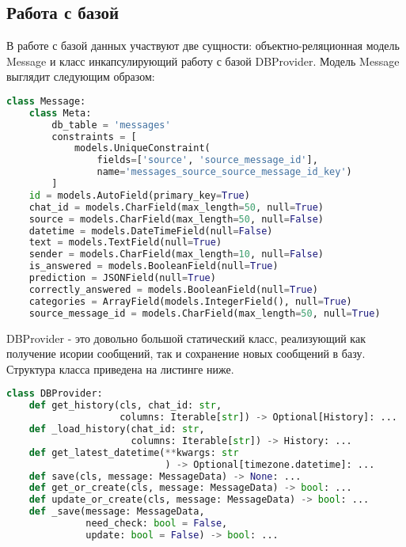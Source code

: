     \subsection{Работа с базой}
    В работе с базой данных участвуют две сущности: объектно-реляционная модель Message
    и класс инкапсулирующий работу с базой DBProvider.
    Модель Message выглядит следующим образом:
\begin{lstlisting}[language=Python]
class Message:
    class Meta:
        db_table = 'messages'
        constraints = [
            models.UniqueConstraint(
                fields=['source', 'source_message_id'],
                name='messages_source_source_message_id_key')
        ]
    id = models.AutoField(primary_key=True)
    chat_id = models.CharField(max_length=50, null=True)
    source = models.CharField(max_length=50, null=False)
    datetime = models.DateTimeField(null=False)
    text = models.TextField(null=True)
    sender = models.CharField(max_length=10, null=False)
    is_answered = models.BooleanField(null=True)
    prediction = JSONField(null=True)
    correctly_answered = models.BooleanField(null=True)
    categories = ArrayField(models.IntegerField(), null=True)
    source_message_id = models.CharField(max_length=50, null=True)
\end{lstlisting}

    DBProvider - это довольно большой статический класс, реализующий как получение исории сообщений,
    так и сохранение новых сообщений в базу.
    Структура класса приведена на листинге ниже.
\begin{lstlisting}[language=Python]
class DBProvider:
    def get_history(cls, chat_id: str, 
                    columns: Iterable[str]) -> Optional[History]: ...
    def _load_history(chat_id: str, 
                      columns: Iterable[str]) -> History: ...
    def get_latest_datetime(**kwargs: str
                            ) -> Optional[timezone.datetime]: ...
    def save(cls, message: MessageData) -> None: ...
    def get_or_create(cls, message: MessageData) -> bool: ...
    def update_or_create(cls, message: MessageData) -> bool: ...
    def _save(message: MessageData, 
              need_check: bool = False, 
              update: bool = False) -> bool: ...
\end{lstlisting}

